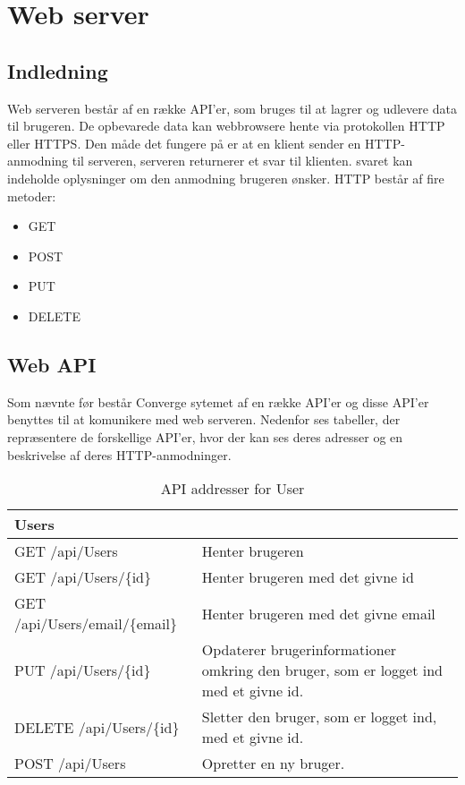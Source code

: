 \chapter{Web server}

\section{Indledning}
Web serveren består af en række API'er, som bruges til at lagrer og udlevere data til brugeren. De opbevarede data kan webbrowsere hente via protokollen HTTP eller HTTPS. Den måde det fungere på er at en klient sender en HTTP-anmodning til serveren, serveren returnerer et svar til klienten. svaret kan indeholde oplysninger om den anmodning brugeren ønsker. 
HTTP består af fire metoder:
 
\begin{itemize}
	\item GET
	\item POST
	\item PUT
	\item DELETE
  \end{itemize}

\section{Web API}
Som nævnte før består Converge sytemet af en række API'er og disse API'er benyttes til at komunikere med web serveren. Nedenfor ses tabeller, der repræsentere de forskellige API'er, hvor der kan ses deres adresser og en beskrivelse af deres HTTP-anmodninger.

\begin{table}[H]
	\centering
	\caption{API addresser for User}
	\label{tab:web_user}
	\begin{tabular}{p{5cm}|p{11cm}}
		\hline
		\multicolumn{2}{l}{\textbf{Users}}\\
		\hline
		GET \newline
		/api/Users &
		Henter brugeren \\
        \hline
        GET \newline
		/api/Users/\{id\} &
		Henter brugeren med det givne id \\
        \hline
        GET \newline
		/api/Users/email/\{email\} &
		Henter brugeren med det givne email\\
        \hline
		PUT \newline
		/api/Users/\{id\} &
		Opdaterer brugerinformationer omkring den bruger, som er logget ind med et givne id. \\
		\hline
		DELETE \newline
		/api/Users/\{id\} &
		Sletter den bruger, som er logget ind, med et givne id. \\
		\hline
		POST \newline
		/api/Users &
		Opretter en ny bruger. \\
		\hline
	\end{tabular}
\end{table}

